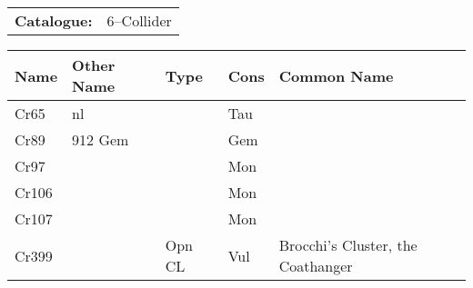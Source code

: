 \begin{tabular}{ p{0.9in} p{1.3in}}
{\bf Catalogue:} & 6--Collider \\ 
\end{tabular}
\begin{longtable}{ p{0.7in}  p{1.0in}  p{0.6in}  p{0.9in}  p{5.1in} }
\hline 
{\bf Name} & {\bf Other Name} & {\bf Type} & {\bf Cons} & {\bf Common Name} \\ 
\hline 
Cr65 & nl &  & Tau &  \\ 
Cr89 & 912 Gem &  & Gem &  \\ 
Cr97 &  &  & Mon &  \\ 
Cr106 &  &  & Mon &  \\ 
Cr107 &  &  & Mon &  \\ 
Cr399 &  & Opn CL & Vul & Brocchi's Cluster, the Coathanger \\ 
\hline 
\end{longtable} 
